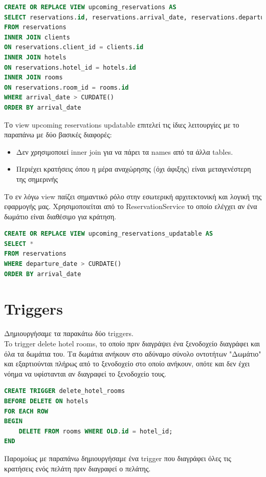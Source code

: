\documentclass[a4paper,12pt]{article}
\begin{document}
\begin{lstlisting}[language=SQL]
CREATE OR REPLACE VIEW upcoming_reservations AS
SELECT reservations.id, reservations.arrival_date, reservations.departure_date, reservations.created_at, reservations.updated_at, clients.first_name, clients.last_name, hotels.name, rooms.room_type
FROM reservations
INNER JOIN clients
ON reservations.client_id = clients.id
INNER JOIN hotels
ON reservations.hotel_id = hotels.id
INNER JOIN rooms
ON reservations.room_id = rooms.id
WHERE arrival_date > CURDATE()
ORDER BY arrival_date
\end{lstlisting}

Το view upcoming reservations updatable επιτελεί τις ίδιες λειτουργίες με το παραπάνω με δύο βασικές διαφορές:
\begin{itemize}
  \item Δεν χρησιμοποιεί inner join για να πάρει τα names από τα άλλα tables.
  \item Περιέχει κρατήσεις όπου η μέρα αναχώρησης (όχι άφιξης) είναι μεταγενέστερη της σημερινής
\end{itemize}
Το εν λόγω view παίζει σημαντικό ρόλο στην εσωτερική αρχιτεκτονική και λογική της εφαρμογής μας. Χρησιμοποιείται από το ReservationService το οποίο ελέγχει αν ένα δωμάτιο είναι διαθέσιμο για κράτηση.

\begin{lstlisting}[language=SQL]
CREATE OR REPLACE VIEW upcoming_reservations_updatable AS
SELECT *
FROM reservations
WHERE departure_date > CURDATE()
ORDER BY arrival_date
\end{lstlisting}

\section{Triggers}
Δημιουργήσαμε τα παρακάτω δύο triggers.\\
To trigger delete hotel rooms, το οποίο πριν διαγράψει ένα ξενοδοχείο διαγράφει και όλα τα δωμάτια του. Τα δωμάτια ανήκουν στο  αδύναμο σύνολο οντοτήτων "Δωμάτιο" και εξαρτιούνται πλήρως από το ξενοδοχείο στο οποίο ανήκουν, οπότε και δεν έχει νόημα να υφίστανται αν διαγραφεί το ξενοδοχείο τους.

\begin{lstlisting}[language=SQL]
CREATE TRIGGER delete_hotel_rooms
BEFORE DELETE ON hotels 
FOR EACH ROW
BEGIN
	DELETE FROM rooms WHERE OLD.id = hotel_id;
END
\end{lstlisting}

Παρομοίως με παραπάνω δημιουργήσαμε ένα trigger που διαγράφει όλες τις κρατήσεις ενός πελάτη πριν διαγραφεί ο πελάτης.
\end{document}

